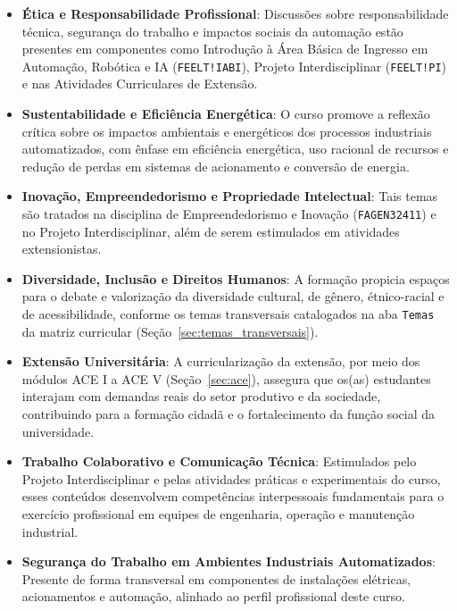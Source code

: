 \begin{itemize}
\item \textbf{Ética e Responsabilidade Profissional}: Discussões sobre responsabilidade técnica, segurança do trabalho e impactos sociais da automação estão presentes em componentes como Introdução à Área Básica de Ingresso em Automação, Robótica e IA (\texttt{FEELT!IABI}), Projeto Interdisciplinar (\texttt{FEELT!PI}) e nas Atividades Curriculares de Extensão.

\item \textbf{Sustentabilidade e Eficiência Energética}: O curso promove a reflexão crítica sobre os impactos ambientais e energéticos dos processos industriais automatizados, com ênfase em eficiência energética, uso racional de recursos e redução de perdas em sistemas de acionamento e conversão de energia.

\item \textbf{Inovação, Empreendedorismo e Propriedade Intelectual}: Tais temas são tratados na disciplina de Empreendedorismo e Inovação (\texttt{FAGEN32411}) e no Projeto Interdisciplinar, além de serem estimulados em atividades extensionistas.

\item \textbf{Diversidade, Inclusão e Direitos Humanos}: A formação propicia espaços para o debate e valorização da diversidade cultural, de gênero, étnico-racial e de acessibilidade, conforme os temas transversais catalogados na aba \texttt{Temas} da matriz curricular (Seção~\ref{sec:temas_transversais}).

\item \textbf{Extensão Universitária}: A curricularização da extensão, por meio dos módulos ACE I a ACE V (Seção~\ref{sec:ace}), assegura que os(as) estudantes interajam com demandas reais do setor produtivo e da sociedade, contribuindo para a formação cidadã e o fortalecimento da função social da universidade.

\item \textbf{Trabalho Colaborativo e Comunicação Técnica}: Estimulados pelo Projeto Interdisciplinar e pelas atividades práticas e experimentais do curso, esses conteúdos desenvolvem competências interpessoais fundamentais para o exercício profissional em equipes de engenharia, operação e manutenção industrial.

\item \textbf{Segurança do Trabalho em Ambientes Industriais Automatizados}: Presente de forma transversal em componentes de instalações elétricas, acionamentos e automação, alinhado ao perfil profissional deste curso.

\end{itemize}

